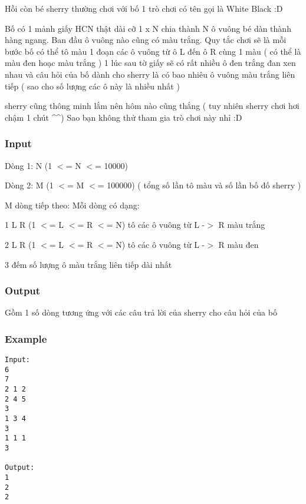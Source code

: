 



   Hồi còn bé sherry thường chơi với bố 1 trò chơi có tên gọi là White Black :D  

   Bố có 1 mảnh giấy HCN thật dài cỡ 1 x N chia thành N ô vuông bé dàn thành hàng ngang. Ban đầu ô vuông nào cũng có màu trắng. Quy tắc chơi sẽ là mỗi bước bố có thể tô màu 1 đoạn các ô vuông từ ô L đến ô R cùng 1 màu ( có thể là màu đen hoạc màu trắng ) 1 lúc sau tờ giấy sẽ có rất nhiều ô đen trắng đan xen nhau và câu hỏi của bố dành cho sherry là có bao nhiêu ô vuông màu trắng liên tiếp ( sao cho số lượng các ô này là nhiều nhất )  

   sherry cũng thông minh lắm nên hôm nào cũng thắng ( tuy nhiên sherry chơi hơi chậm 1 chút \textasciicircum\textasciicircum ) Sao bạn không thử tham gia trò chơi này nhỉ :D  

\subsubsection{   Input  }

   Dòng 1: N (1 $<$= N $<$= 10000)  

   Dòng 2: M (1 $<$= M $<$= 100000) ( tổng số lần tô màu và số lần bố đố sherry )  

   M dòng tiếp theo: Mỗi dòng có dạng:  

   1  L  R  (1 $<$= L $<$= R $<$= N) tô các ô vuông từ L -$>$ R màu trắng  

   2  L  R  (1 $<$= L $<$= R $<$= N) tô các ô vuông từ L -$>$ R màu đen  

   3 đếm số lượng ô màu trắng liên tiếp dài nhất  

\subsubsection{   Output  }

   Gồm 1 số dòng tương ứng với các câu trả lời của sherry cho câu hỏi của bố  

\subsubsection{   Example  }
\begin{verbatim}
Input:
6
7
2 1 2
2 4 5
3
1 3 4
3
1 1 1
3

Output:
1
2
2
\end{verbatim}